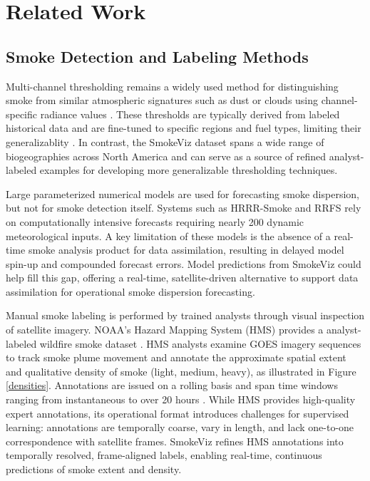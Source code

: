 \documentclass{article}
\begin{document}
\section{Related Work}

\subsection{Smoke Detection and Labeling Methods}

Multi-channel thresholding remains a widely used method for distinguishing smoke from similar atmospheric signatures such as dust or clouds using channel-specific radiance values \cite{threshold}. These thresholds are typically derived from labeled historical data and are fine-tuned to specific regions and fuel types, limiting their generalizablity \cite{thresh_geog}. In contrast, the SmokeViz dataset spans a wide range of biogeographies across North America and can serve as a source of refined analyst-labeled examples for developing more generalizable thresholding techniques.

Large parameterized numerical models are used for forecasting smoke dispersion, but not for smoke detection itself. Systems such as HRRR-Smoke and RRFS \cite{hrrr, rrfs} rely on computationally intensive forecasts requiring nearly 200 dynamic meteorological inputs. A key limitation of these models is the absence of a real-time smoke analysis product for data assimilation, resulting in delayed model spin-up and compounded forecast errors. Model predictions from SmokeViz could help fill this gap, offering a real-time, satellite-driven alternative to support data assimilation for operational smoke dispersion forecasting.

Manual smoke labeling is performed by trained analysts through visual inspection of satellite imagery. NOAA’s Hazard Mapping System (HMS) provides a analyst-labeled wildfire smoke dataset \cite{hms, hms_val}. HMS analysts examine GOES imagery sequences to track smoke plume movement and annotate the approximate spatial extent and qualitative density of smoke (light, medium, heavy), as illustrated in Figure \ref{densities}. Annotations are issued on a rolling basis and span time windows ranging from instantaneous to over 20 hours \cite{hms_web}. While HMS provides high-quality expert annotations, its operational format introduces challenges for supervised learning: annotations are temporally coarse, vary in length, and lack one-to-one correspondence with satellite frames. SmokeViz refines HMS annotations into temporally resolved, frame-aligned labels, enabling real-time, continuous predictions of smoke extent and density.
\end{document}
